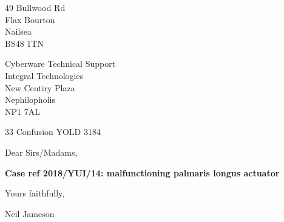 \documentclass[11pt,a4paper]{letter}
\begin{document}
\begin{letter}

\thispagestyle{empty}

\begin{flushright}
49 Bullwood Rd\\
Flax Bourton\\
Nailsea\\
BS48 1TN
\end{flushright}

Cyberware Technical Support\\
Integral Technologies\\
New Centiry Plaza\\
Nephilopholis\\
NP1 7AL

33 Confusion YOLD 3184

Dear Sirs/Madams,

\begin{center}
\textbf{Case ref 2018/YUI/14: malfunctioning palmaris longus actuator}
\end{center}

\Blindtext

Yours faithfully,

\vspace{15mm}
Neil Jameson

\end{letter}
\end{document}
